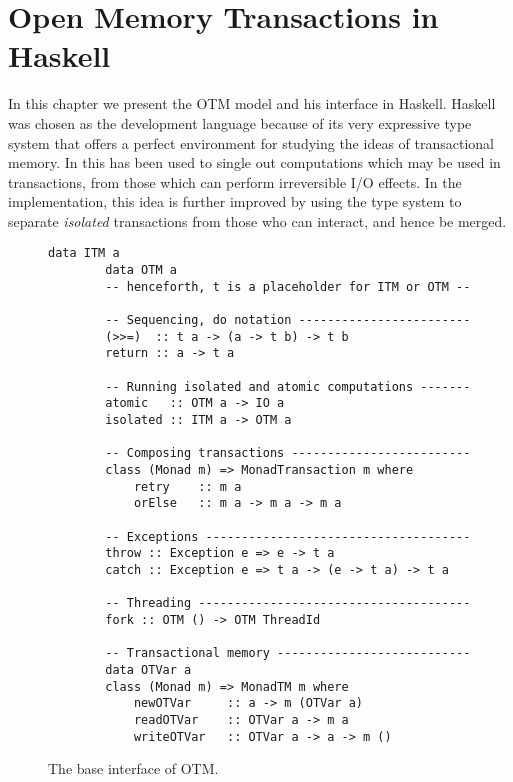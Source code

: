 
\chapter{Open Memory Transactions in Haskell}

In this chapter we present the OTM model and his interface in Haskell.
Haskell was chosen as the development language because of its very expressive type system that offers a perfect environment for studying the ideas of transactional memory.
In \cite{Harris:2005:CMT:1065944.1065952} this has been used to single out computations which may be used in transactions, from those which can perform irreversible I/O effects. 
In the implementation, this idea is further improved by using the type system to separate \emph{isolated} transactions from those who can interact, and hence be merged.

\begin{figure}
    \centering
    \begin{Verbatim}[tabsize=3, gobble=2]
        data ITM a
        data OTM a
        -- henceforth, t is a placeholder for ITM or OTM --
        
        -- Sequencing, do notation ------------------------
        (>>=)  :: t a -> (a -> t b) -> t b
        return :: a -> t a
        
        -- Running isolated and atomic computations -------
        atomic   :: OTM a -> IO a
        isolated :: ITM a -> OTM a
        
        -- Composing transactions -------------------------
        class (Monad m) => MonadTransaction m where
            retry    :: m a
            orElse   :: m a -> m a -> m a
        
        -- Exceptions -------------------------------------
        throw :: Exception e => e -> t a
        catch :: Exception e => t a -> (e -> t a) -> t a
        
        -- Threading --------------------------------------
        fork :: OTM () -> OTM ThreadId
        
        -- Transactional memory ---------------------------
        data OTVar a
        class (Monad m) => MonadTM m where
            newOTVar     :: a -> m (OTVar a)
            readOTVar    :: OTVar a -> m a
            writeOTVar   :: OTVar a -> a -> m ()

    \end{Verbatim}
    \caption{The base interface of OTM.}
    \label{fig:base-interface}
\end{figure}

